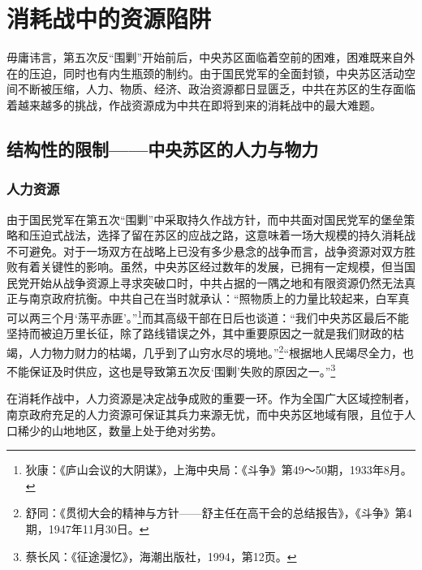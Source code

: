 \chapter{消耗战中的资源陷阱}


毋庸讳言，第五次反“围剿”开始前后，中央苏区面临着空前的困难，困难既来自外在的压迫，同时也有内生瓶颈的制约。由于国民党军的全面封锁，中央苏区活动空间不断被压缩，人力、物质、经济、政治资源都日显匮乏，中共在苏区的生存面临着越来越多的挑战，作战资源成为中共在即将到来的消耗战中的最大难题。

\section{结构性的限制——中央苏区的人力与物力}

\subsection{人力资源}


由于国民党军在第五次“围剿”中采取持久作战方针，而中共面对国民党军的堡垒策略和压迫式战法，选择了留在苏区的应战之路，这意味着一场大规模的持久消耗战不可避免。对于一场双方在战略上已没有多少悬念的战争而言，战争资源对双方胜败有着关键性的影响。虽然，中央苏区经过数年的发展，已拥有一定规模，但当国民党开始从战争资源上寻求突破口时，中共占据的一隅之地和有限资源仍然无法真正与南京政府抗衡。中共自己在当时就承认：“照物质上的力量比较起来，白军真可以两三个月‘荡平赤匪’。”\footnote{狄康：《庐山会议的大阴谋》，上海中央局：《斗争》第49～50期，1933年8月。}而其高级干部在日后也谈道：“我们中央苏区最后不能坚持而被迫万里长征，除了路线错误之外，其中重要原因之一就是我们财政的枯竭，人力物力财力的枯竭，几乎到了山穷水尽的境地。”\footnote{舒同：《贯彻大会的精神与方针——舒主任在高干会的总结报告》，《斗争》第4期，1947年11月30日。}“根据地人民竭尽全力，也不能保证及时供应，这也是导致第五次反‘围剿’失败的原因之一。”\footnote{蔡长风：《征途漫忆》，海潮出版社，1994，第12页。}


在消耗作战中，人力资源是决定战争成败的重要一环。作为全国广大区域控制者，南京政府充足的人力资源可保证其兵力来源无忧，而中央苏区地域有限，且位于人口稀少的山地地区，数量上处于绝对劣势。


